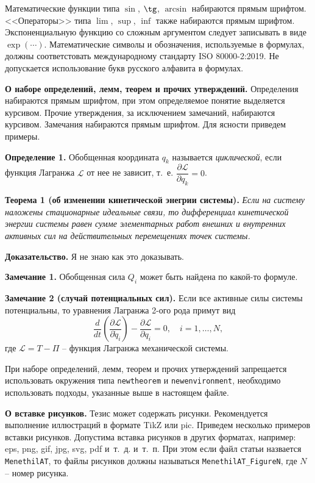 \documentclass[
	openany, %
	11pt, %
	a4paper, %
]{book} %
\begin{document}
Математические функции типа $\sin$, $\tg$, $\arcsin$ набираются прямым шрифтом. <<Операторы>> типа $\lim$, $\sup$, $\inf$ также набираются прямым шрифтом. Экспоненциальную функцию со сложным аргументом следует записывать в виде $\exp(\cdots)$. Математические символы и обозначения, используемые в формулах, должны соответстовать международному стандарту ISO 80000-2:2019. Не допускается использование букв русского алфавита в формулах.

\textbf{О наборе определений, лемм, теорем и прочих утверждений.} Определения набираются прямым шрифтом, при этом определяемое понятие выделяется курсивом. Прочие утверждения, за исключением замечаний, набираются курсивом. Замечания набираются прямым шрифтом. Для ясности приведем примеры. 

\textbf{Определение 1.} Обобщенная координата $q_k$ называется \textit{циклической}, если функция Лагранжа $\mathcal L$ от нее не зависит, т.~е. $\dfrac{\partial \mathcal L}{\partial q_k} = 0$.

\textbf{Теорема 1 (об изменении кинетической энегрии системы).} \textit{Если на систему наложены стационарные идеальные связи, то дифференциал кинетической энергии системы равен сумме элементарных работ внешних и внутренних активных сил на действительных перемещениях точек системы.}

\textbf{Доказательство.} Я не знаю как это доказывать.

\textbf{Замечание 1.} Обобщенная сила $Q_i$ может быть найдена по какой-то формуле. 

\textbf{Замечание 2 (случай потенциальных сил).} Если все активные силы системы потенциальны, то уравнения Лагранжа 2-ого рода примут вид
\begin{equation*}
    \frac{d}{d t} \left(\frac{\partial \mathscr{L}}{\partial \dot{q}_i}\right) - \frac{\partial \mathscr{L}}{\partial q_i} = 0, \quad i = 1,\dots,N,
\end{equation*} 
где $\mathscr{L} = T - \Pi$ -- функция Лагранжа механической системы.

При наборе определений, лемм, теорем и прочих утверждений запрещается использовать окружения типа \verb|newtheorem| и \verb|newenvironment|, необходимо использовать подходы, указанные выше в настоящем файле.

\textbf{О вставке рисунков.} Тезис может содержать рисунки. Рекомендуется выполнение иллюстраций в формате TikZ или pic. Приведем несколько примеров вставки рисунков. Допустима вставка рисунков в других форматах, например: eps, png, gif, jpg, svg, pdf и~т.~д. и~т.~п. При этом если файл статьи назвается \verb|MenethilAT|, то файлы рисунков должны называться \verb|MenethilAT_FigureN|, где $N$ -- номер рисунка. 
\end{document}
